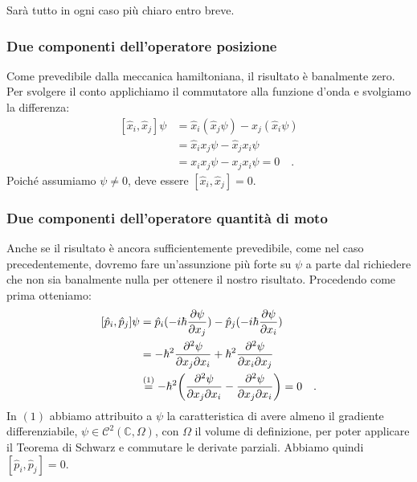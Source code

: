 Sarà tutto in ogni caso più chiaro entro breve.

\subsubsection{Due componenti dell'operatore posizione}
Come prevedibile dalla meccanica hamiltoniana, il risultato è banalmente zero. Per svolgere il conto applichiamo il commutatore alla funzione d'onda e svolgiamo la differenza:
\[
\begin{aligned}
    [\hat{{x}}_i, \hat{{x}}_j]\psi &= \hat{x}_i (\hat{x}_j \psi) - \hat{x}_j (\hat{x}_i \psi) \\
    &= \hat{x}_i x_j\psi - \hat{x}_j x_i\psi \\
    &= {x}_i x_j\psi - {x}_j x_i\psi = 0 \quad.
\end{aligned}
\]
Poiché assumiamo $\psi \neq 0$, deve essere $[\hat{{x}}_i, \hat{{x}}_j] = 0$.

\subsubsection{Due componenti dell'operatore quantità di moto}
Anche se il risultato è ancora sufficientemente prevedibile, come nel caso precedentemente, dovremo fare un'assunzione più forte su $\psi$ a parte dal richiedere che non sia banalmente nulla per ottenere il nostro risultato. Procedendo come prima otteniamo:
\[
\begin{aligned}
    [\hat{{p}}_i, \hat{{p}}_j]\psi &= \hat{p}_i (-i\hbar\pdv{\psi}{x_j} ) - \hat{p}_j (-i\hbar\pdv{\psi}{x_i} ) \\
    &= -\hbar^2 \pdv{\psi}{x_j}{x_i} +\hbar^2 \pdv{\psi}{x_i}{x_j} \\
    &\overset{(1)}{=} -\hbar^2 \bigg( \pdv{\psi}{x_j}{x_i} - \pdv{\psi}{x_j}{x_i} \bigg)= 0 \quad.
\end{aligned}
\]
In $(1)$ abbiamo attribuito a $\psi$ la caratteristica di avere almeno il gradiente differenziabile, $\psi \in \mathcal{C}^2(\mathbb{C}, \Omega)$, con $\Omega$ il volume di definizione, per poter applicare il Teorema di Schwarz e commutare le derivate parziali. Abbiamo quindi $[\hat{{p}}_i, \hat{{p}}_j] = 0$.

